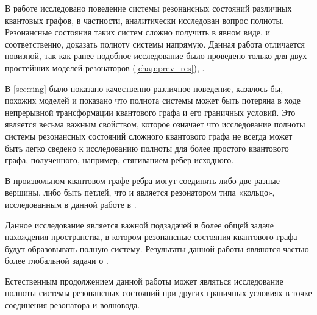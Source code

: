 \startconclusionpage

В работе исследовано поведение системы резонансных состояний различных квантовых графов, в частности, аналитически исследован вопрос полноты. Резонансные состояния таких систем сложно получить в явном виде, и соответственно, доказать полноту системы напрямую. Данная работа отличается новизной, так как ранее подобное исследование было проведено только для двух простейших моделей резонаторов (\autoref{chap:prev_res}), .

В \autoref{sec:ring} было показано качественно различное поведение, казалось бы, похожих моделей и показано что полнота системы может быть потеряна в ходе непрерывной трансформации квантового графа и его граничных условий. Это является весьма важным свойством, которое означает что исследование полноты системы резонансных состояний сложного квантового графа не всегда может быть легко сведено к исследованию полноты для более простого квантового графа, полученного, например, стягиванием ребер исходного. 

В произвольном квантовом графе ребра могут соединять либо две разные вершины, либо быть петлей, что и является резонатором типа «кольцо», исследованным в данной работе в \label{sec:ring}. 

Данное исследование является важной подзадачей в более общей задаче нахождения пространства, в котором резонансные состояния квантового графа будут образовывать полную систему. Результаты данной работы являются частью более глобальной задачи о .

Естественным продолжением данной работы может являться исследование полноты системы резонансных состояний при других граничных условиях в точке соединения резонатора и волновода.